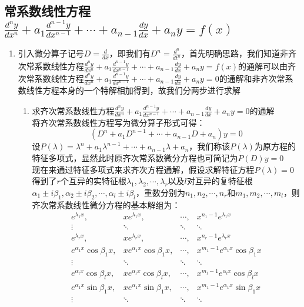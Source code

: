 \documentclass[12pt,a4paper,UTF8]{book}
\begin{document}
\subsection{常系数线性方程$\frac{d^ny}{dx^n}+a_1\frac{d^{n-1}y}{dx^{n-1}}+\cdots+a_{n-1}\frac{dy}{dx}+a_ny=f\left(x\right)$}
\begin{enumerate}
\item 引入微分算子记号$D=\frac{d}{dx}$，即我们有$D^n=\frac{d^n}{dt^n}$，首先明确思路，我们知道非齐次常系数线性方程$\frac{d^ny}{dx^n}+a_1\frac{d^{n-1}y}{dx^{n-1}}+\cdots+a_{n-1}\frac{dy}{dx}+a_ny=f\left(x\right)$的通解可以由齐次常系数线性方程$\frac{d^ny}{dx^n}+a_1\frac{d^{n-1}y}{dx^{n-1}}+\cdots+a_{n-1}\frac{dy}{dx}+a_ny=0$的通解和非齐次常系数线性方程本身的一个特解相加得到，故我们分两步进行求解
\begin{enumerate}
\item 求齐次常系数线性方程$\frac{d^ny}{dx^n}+a_1\frac{d^{n-1}y}{dx^{n-1}}+\cdots+a_{n-1}\frac{dy}{dx}+a_ny=0$的通解\\
将齐次常系数线性方程写为微分算子形式可得：
\[\left(D^n+a_1D^{n-1}+\cdots+a_{n-1}D+a_n\right)y=0\]
设$P\left(\lambda\right)={\lambda}^n+a_1{\lambda}^{n-1}+\cdots+a_{n-1}\lambda+a_n$，我们称该$P\left(\lambda\right)$为原方程的特征多项式，显然此时原齐次常系数微分方程也可简记为$P\left(D\right)y=0$\\
现在来通过特征多项式来求齐次方程通解，假设求解特征方程$P\left(\lambda\right)=0$得到了$r$个互异的实特征根$\lambda_1,\lambda_2,\cdots,\lambda_r$以及$l$对互异的复特征根$\alpha_1\pm i\beta_1,\alpha_2\pm i\beta_2,\cdots,\alpha_l\pm i\beta_l$，重数分别为$n_1,n_2,\cdots,n_r$和$m_1,m_2,\cdots,m_l$，则齐次常系数线性微分方程的基本解组为：
\[\begin{matrix}
e^{\lambda_1x},&xe^{\lambda_1x},&\cdots,&x^{n_1-1}e^{\lambda_1x}\\
\vdots&\ddots&\ddots&\ddots\\
e^{\lambda_rx},&xe^{\lambda_rx},&\cdots,&x^{n_r-1}e^{\lambda_rx}\\
e^{\alpha_1x}\cos\beta_1x,&xe^{\alpha_1x}\cos\beta_1x,&\cdots,&x^{m_1-1}e^{\alpha_1x}\cos\beta_1x\\
\vdots&\ddots&\ddots&\ddots\\
e^{\alpha_lx}\cos\beta_lx,&xe^{\alpha_lx}\cos\beta_lx,&\cdots,&x^{m_l-1}e^{\alpha_lx}\cos\beta_lx\\
e^{\alpha_1x}\sin\beta_1x,&xe^{\alpha_1x}\sin\beta_1x,&\cdots,&x^{m_1-1}e^{\alpha_1x}\sin\beta_1x\\
\vdots&\ddots&\ddots&\ddots\\

\end{matrix}\]
\end{enumerate}
\end{enumerate}
\end{document}

